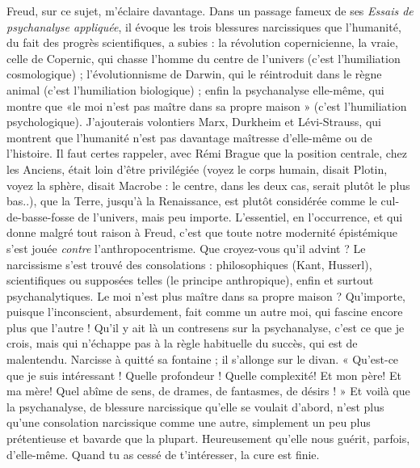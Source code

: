 Freud, sur ce sujet, m’éclaire davantage. Dans un passage fameux de ses
{\it Essais de psychanalyse appliquée}, il évoque les trois blessures narcissiques que
l’humanité, du fait des progrès scientifiques, a subies : la révolution copernicienne,
la vraie, celle de Copernic, qui chasse l’homme du centre de l’univers
(c’est l’humiliation cosmologique) ; l’évolutionnisme de Darwin, qui le réintroduit
dans le règne animal (c’est l’humiliation biologique) ; enfin la psychanalyse
elle-même, qui montre que «le moi n’est pas maître dans sa propre
maison » (c'est l’humiliation psychologique). J’ajouterais volontiers Marx,
Durkheim et Lévi-Strauss, qui montrent que l'humanité n’est pas davantage
maîtresse d’elle-même ou de l’histoire. Il faut certes rappeler, avec Rémi Brague
que la position centrale, chez les Anciens, était loin d’être privilégiée (voyez le
corps humain, disait Plotin, voyez la sphère, disait Macrobe : le centre, dans les
deux cas, serait plutôt le plus bas..), que la Terre, jusqu’à la Renaissance, est
plutôt considérée comme le cul-de-basse-fosse de l’univers, mais peu importe.
L'essentiel, en l’occurrence, et qui donne malgré tout raison à Freud, c’est que
toute notre modernité épistémique s’est jouée {\it contre} l’anthropocentrisme. Que
croyez-vous qu’il advint ? Le narcissisme s’est trouvé des consolations : philosophiques
(Kant, Husserl), scientifiques ou supposées telles (le principe anthropique),
enfin et surtout psychanalytiques. Le moi n’est plus maître dans sa
propre maison ? Qu'importe, puisque l’inconscient, absurdement, fait comme
un autre moi, qui fascine encore plus que l’autre ! Qu'il y ait là un contresens
sur la psychanalyse, c’est ce que je crois, mais qui n’échappe pas à la règle habituelle
du succès, qui est de malentendu. Narcisse à quitté sa fontaine ; il
s’allonge sur le divan. « Qu'est-ce que je suis intéressant ! Quelle profondeur !
Quelle complexité! Et mon père! Et ma mère! Quel abîme de sens, de
drames, de fantasmes, de désirs ! » Et voilà que la psychanalyse, de blessure narcissique
qu’elle se voulait d’abord, n’est plus qu’une consolation narcissique
comme une autre, simplement un peu plus prétentieuse et bavarde que la plupart.
Heureusement qu’elle nous guérit, parfois, d’elle-même. Quand tu as
cessé de t’intéresser, la cure est finie.


